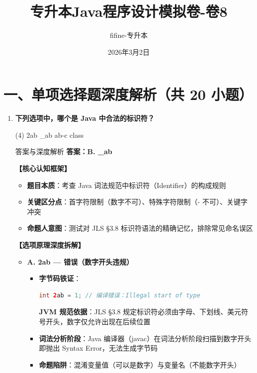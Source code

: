 \documentclass[12pt, a4paper]{ctexart}
\title{\textcolor{myblue}{\textbf{专升本Java程序设计模拟卷-卷8}}}
\author{fifine-专升本}
\date{2026年3月2日}
\begin{document}
\maketitle
\thispagestyle{empty}
\newpage

\section*{一、单项选择题深度解析（共 20 小题）}

\begin{enumerate}[label=\textbf{\arabic*.}, leftmargin=*, itemsep=1.5em]
	\item \textbf{下列选项中，哪个是 Java 中合法的标识符？}
	      \begin{tasks}(4)
		      \task 2ab \task \_ab \task ab-c \task class
	      \end{tasks}
	      \begin{bluebox}{答案与深度解析}
		      \textbf{答案：B. \_ab}

		      \textbf{【核心认知框架】}
		      \begin{itemize}[leftmargin=*, nosep]
			      \item \textbf{题目本质}：考查 Java 词法规范中标识符（Identifier）的构成规则
			      \item \textbf{关键区分点}：首字符限制（数字不可）、特殊字符限制（- 不可）、关键字冲突
			      \item \textbf{命题人意图}：测试对 JLS §3.8 标识符语法的精确记忆，排除常见命名误区
		      \end{itemize}

		      \textbf{【选项原理深度拆解】}
		      \begin{itemize}[leftmargin=*, nosep]
			      \item \textbf{A. 2ab — 错误（数字开头违规）}
			            \begin{itemize}[leftmargin=*, nosep]
				            \item \textbf{字节码铁证}：
				                  \begin{lstlisting}[language=Java]
int 2ab = 1; // 编译错误：Illegal start of type
        \end{lstlisting}
				                  \textbf{JVM 规范依据}：JLS §3.8 规定标识符必须由字母、下划线、美元符号开头，数字仅允许出现在后续位置
				            \item \textbf{词法分析阶段}：Java 编译器（javac）在词法分析阶段扫描到数字开头即抛出 Syntax Error，无法生成字节码
				            \item \textbf{命题陷阱}：混淆变量值（可以是数字）与变量名（不能数字开头）
			            \end{itemize}


\end{itemize}
\end{bluebox}
\end{enumerate}
\end{document}
